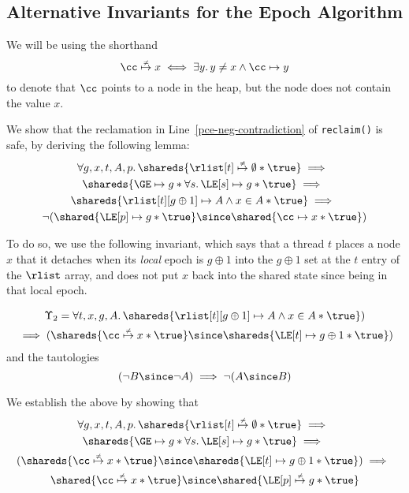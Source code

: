 %

\newcommand{\nmapsto}{\stackrel{{\scriptscriptstyle\neq}}{\mapsto}}

\clearpage
\subsection{Alternative Invariants for the Epoch Algorithm}


We will be using the shorthand
\[
\cc \nmapsto x \iff \exists y.\, y \neq x \land \cc \mapsto y
\]
to denote that $\cc$ points to a node in the heap, but the node does not contain the value $x$.

We show that the reclamation in Line~\ref{pce-neg-contradiction} of \texttt{reclaim()}
is safe, by deriving the following lemma:
\begin{multline}
\forall g,x,t,A,p.\, 
\shareds{\rlist[t] \nmapsto \emptyset * \true} \implies \mbox{}
\\
\shareds{\GE\mapsto g * \forall s.\,\LE[s] \mapsto g * \true} \implies \mbox{} 
\\
\shareds{\rlist[t][g \oplus 1]\mapsto A \land x \in A * \true} \implies \mbox{}
\\
\neg (\shared{\LE[p] \mapsto g * \true} \since \shared{\cc \mapsto x * \true})
\end{multline}

To do so, we use the following invariant, which says that a thread $t$ places a node $x$ that it
detaches when its \emph{local} epoch is $g \oplus 1$ into the $g \oplus 1$ set
at the $t$ entry of the $\rlist$ array, and does not put $x$ back into the shared state
since being in that local epoch.

\begin{multline}
\Upsilon_{2}= \forall t,x,g,A .\, 
\shareds{\rlist[t][g \oplus 1] \mapsto A  \land x \in A * \true})
\\
\mbox{} \implies 
(\shareds{\cc\nmapsto x * \true}  
\since
\shareds{\LE[t] \mapsto  g \oplus 1 * \true})  
\end{multline}
and the tautologies
\begin{equation}
(\neg B \since \neg A) \implies \neg (A \since B)
\end{equation}


We establish the above by showing that
\begin{multline}
\forall g,x,t,A,p.\, 
\shareds{\rlist[t] \nmapsto \emptyset * \true} \implies \mbox{}
\\
\shareds{\GE\mapsto g * \forall s.\,\LE[s] \mapsto g * \true} \implies \mbox{} \\
(\shareds{\cc\nmapsto x * \true}  
\since
\shareds{\LE[t] \mapsto  g \oplus 1 * \true}) \implies \mbox{}\\
\shared{\cc \nmapsto x * \true} \since \shared{\LE[p] \nmapsto g * \true}
\end{multline}

